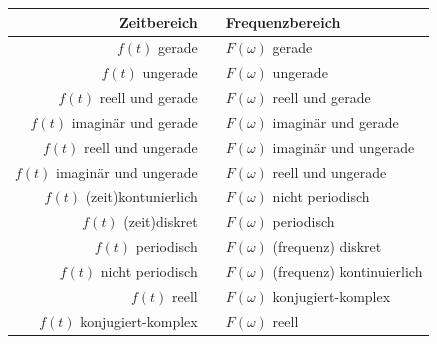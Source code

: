 					\renewcommand{\arraystretch}{1}					
					\begin{tabular}{|rcl|}
						\hline 
							\textbf{Zeitbereich} & \laplace  & \textbf{Frequenzbereich} \\ 
						\hline 
						\hline
							$f(t)$ gerade & \laplace & $F(\omega)$ gerade  \\ 
						\hline 
							$f(t)$ ungerade & \laplace & $F(\omega)$ ungerade \\ 
						\hline 
						\hline 
							$f(t)$ reell und gerade & \laplace & $F(\omega)$ reell und gerade\\ 
						\hline 
							$f(t)$ imaginär und gerade & \laplace & $F(\omega)$ imaginär und gerade \\ 
						\hline 
						\hline 
							$f(t)$ reell und ungerade & \laplace & $F(\omega)$ imaginär und ungerade \\ 
						\hline 
							$f(t)$ imaginär und ungerade & \laplace & $F(\omega)$ reell und ungerade\\ 
						\hline 
						\hline 
							$f(t)$ (zeit)kontunierlich & \laplace & $F(\omega)$ nicht periodisch \\ 
						\hline 
							$f(t)$ (zeit)diskret & \laplace & $F(\omega)$ periodisch \\ 
						\hline 
						\hline 
							$f(t)$ periodisch & \laplace & $F(\omega)$ (frequenz) diskret\\ 
						\hline 
							$f(t)$ nicht periodisch & \laplace & $F(\omega)$ (frequenz) kontinuierlich\\ 
						\hline 
						\hline 
							$f(t)$ reell & \laplace & $F(\omega)$ konjugiert-komplex\\ 
						\hline 
							$f(t)$ konjugiert-komplex & \laplace & $F(\omega)$ reell\\ 
						\hline 
					\end{tabular}
					\renewcommand{\arraystretch}{\arraystretchOriginal}	
				

